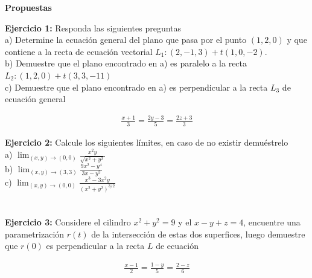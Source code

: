 \documentclass[a4paper]{article}
\begin{document}
\begin{center}
    \Large{\textbf{Propuestas}}
\end{center}

\setlength{\parindent}{0cm}


\textbf{Ejercicio 1:} Responda las siguientes preguntas \\


a) Determine la ecuación general del plano que pasa por el punto $(1,2,0)$ y que contiene a la recta de ecuación vectorial $L_1: (2,-1,3)+t(1,0,-2)$. \\


b) Demuestre que el plano  encontrado en a) es paralelo a la recta $L_2: (1,2,0)+t(3,3,-11)$ \\ 

c) Demuestre que el plano  encontrado en a) es perpendicular a la recta $L_3$ de ecuación general 

\begin{align*}
    \frac{x+1}{3} = \frac{2y-3}{5} =\frac{2z+3}{3}
\end{align*}











\textbf{Ejercicio 2:} Calcule los siguientes límites, en caso de no existir demuéstrelo \\

a) $\displaystyle \lim_{(x,y) \to (0,0)} \frac{x^2y}{\sqrt{x^2+y^2}}$ \\


b) $\displaystyle \lim_{(x,y) \to (3,3)} \frac{9x^2-y^4}{3x-y^2}$ \\

c) $\displaystyle \lim_{(x,y) \to (0,0)} \frac{x^3-3x^2y}{(x^2+y^2)^{3/2}}$ \\ \\ \\


\textbf{Ejercicio 3:} Considere el cilindro $x^2+y^2=9$ y el $x-y+z=4$, encuentre una parametrización $r(t)$ de la intersección de estas dos superfices, luego demuestre que $r(0)$ es perpendicular a la recta $L$ de ecuación

\begin{align*}
    \frac{x-1}{2} = \frac{1-y}{5} = \frac{2-z}{6}
\end{align*}
\end{document}

